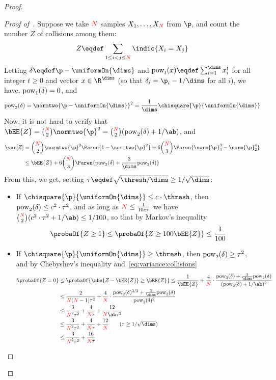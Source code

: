 \documentclass[11pt]{article}
\begin{document}
\begin{proof}
\begin{proof}[Proof of~]
Suppose we take ${\textcolor{red}{N}}$ \iid samples $X_1,\dots, X_{\textcolor{red}{N}}$ from $\p$, and count the number $Z$ of collisions among them:
\[
		Z \eqdef \sum_{1\leq i < j \leq \bigns} \indic{X_i = X_j}
\]
Letting $\del \eqdef \p - \uniformOn{\dims}$ and $\pow_t(x) \eqdef \sum_{i=1}^{\dims} x_i^t$ for all integer $t\geq 0$ and vector $x\in\R^{\dims}$ (so that $\del_i = \p_i - 1/\dims$ for all $i$), we have, $\mathrm{pow}_1(\delta) = 0$, and 
\[
\pow_2(\del) = \normtwo{\p-\uniformOn{\dims}}^2 = \frac{1}{\dims}\chisquare{\p}{\uniformOn{\dims}}
\]
Now, it is not hard to verify that $\bEE{Z} = \binom{\bigns}{2} \normtwo{\p}^2 = \binom{\bigns}{2} (\pow_2(\del)+1/\ab)$, and 
\begin{align} %
\var[Z] 
&= \binom{\bigns}{2} \normtwo{\p}^2 \Paren{1-\normtwo{\p}^2} + 6\binom{\bigns}{3}\Paren{\norm{\p}_3^3 - \norm{\p}_2^4} \notag\\
%
&\leq \bEE{Z} + 6\binom{\bigns}{3}\Paren{\pow_3(\del) + \frac{3}{\dims}\pow_2(\del)} \label{eq:variance:collisions}  %
\end{align}
From this, we get, setting $\tau \eqdef \sqrt{{\thresh}/{\dims}} \geq 1/\sqrt{\dims}$:
\begin{itemize}
\item If $\chisquare{\p}{\uniformOn{\dims}}\leq c\cdot \thresh$, then $\mathrm{pow}_2(\delta) \leq c^2\cdot \tau^2$, and as long as ${\textcolor{red}{N}} \leq \frac{1}{10c\tau}$ we have $\binom{\bigns}{2} (c^2\cdot \tau^2+1/\ab) \leq 1/100$, so that by Markov's inequality
\[
	\probaOf{Z \geq 1 } \leq \probaOf{Z \geq 100\bEE{Z} } \leq \frac{1}{100}
\]
\item If $\chisquare{\p}{\uniformOn{\dims}}\geq \thresh$, then $\mathrm{pow}_2(\delta) \geq \tau^2$,  and by Chebyshev's inequality and~\cref{eq:variance:collisions}
\begin{align*}
	\probaOf{Z = 0 } 
	&\leq \probaOf{\abs{Z - \bEE{Z}} \geq \bEE{Z} } 
	\leq \frac{1}{\bEE{Z}} + \frac{4}{\bigns}\cdot \frac{\pow_3(\del) + \frac{3}{\dims}\pow_2(\del)}{(\pow_2(\del)+1/\ab)^2} \\
	&\leq \frac{2}{\bigns(\bigns-1)\tau^2} + \frac{4}{\bigns}\cdot \frac{\pow_2(\del)^{3/2} + \frac{3}{\dims}\pow_2(\del)}{\pow_2(\del)^2} \\
	&\leq \frac{3}{\bigns^2\tau^2} + \frac{4}{\bigns\tau}+ \frac{12}{\bigns\ab\tau^2}\\
	&\leq \frac{3}{\bigns^2\tau^2} + \frac{4}{\bigns\tau}+ \frac{12}{\bigns} \tag{$\tau\geq 1/\sqrt{\dims}$}\\
	&\leq \frac{3}{\bigns^2\tau^2} + \frac{16}{\bigns\tau}

\end{align*}
\end{itemize}
\end{proof}
\end{proof}
\end{document}
